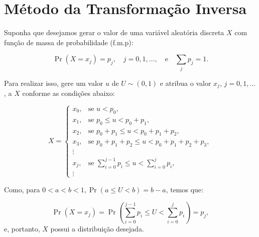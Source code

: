 \documentclass[
  letterpaper,
  DIV=11,
  numbers=noendperiod]{scrreprt}
\begin{document}
\section{Método da Transformação
Inversa}\label{muxe9todo-da-transformauxe7uxe3o-inversa}

Suponha que desejamos gerar o valor de uma variável aleatória discreta
\(X\) com função de massa de probabilidade (f.m.p):

\[\Pr(X = x_j) = p_j, \quad j = 0, 1, \dots, \quad \text{e} \quad \sum\limits_j p_j = 1.\]

Para realizar isso, gere um valor \(u\) de \(U\sim(0,1)\) e atribua o
valor \(x_j\), \(j=0,1,\ldots\), a \(X\) conforme as condições abaixo:

\[X = \begin{cases}
x_0, & \text{se } u < p_0, \\
x_1, & \text{se } p_0 \leq u < p_0+p_1, \\
x_2, & \text{se } p_0+p_1 \leq u < p_0+p_1+p_2, \\
x_3, & \text{se } p_0+p_1+p_2 \leq u < p_0+p_1+p_2+p_3, \\
\vdots & \\
x_j, & \text{se } \displaystyle \sum_{i=0}^{j-1} p_i \leq u < \sum_{i=0}^{j} p_i, \\
\vdots &
\end{cases}\]

Como, para \(0 < a < b < 1, \Pr(a \leq U < b) = b-a\), temos que:

\[\Pr(X = x_j) = \Pr\left(\sum\limits_{i=0}^{j-1}p_i \leq U < \sum\limits_{i=0}^{j}p_i\right) = p_j,\]
e, portanto, \(X\) possui a distribuição desejada.
\end{document}
